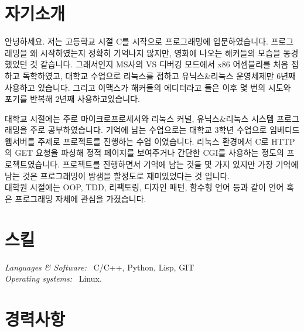 \documentclass[line,margin]{res}
\begin{document}
\address{H.P: 010-8633-9775}
\address{E-mail: vmfhrmfoaj@yahoo.com}


\begin{resume}

  \section{자기소개}

  안녕하세요.
  저는 고등학교 시절 C를 시작으로 프로그래밍에 입문하였습니다.
  프로그래밍을 왜 시작하였는지 정확히 기억나지 않지만, 영화에 나오는 해커들의 모습을 동경했었던 것 같습니다.
  그래서인지 MS사의 VS 디버깅 모드에서 x86 어셈블리를 처음 접하고 독학하였고,
  대학교 수업으로 리눅스를 접하고 유닉스\&리눅스 운영체제만 6년째 사용하고 있습니다.
  그리고 이맥스가 해커들의 에디터라고 들은 이후 몇 번의 시도와 포기를 반복해 2년째 사용하고있습니다.

  대학교 시절에는 주로 마이크로프로세서와 리눅스 커널, 유닉스\&리눅스 시스템 프로그래밍을 주로 공부하였습니다.
  기억에 남는 수업으로는 대학교 3학년 수업으로 임베디드 웹서버를 주제로 프로젝트를 진행하는 수업 이였습니다.
  리눅스 환경에서 C로 HTTP의 GET 요청을 파싱해 정적 페이지를 보여주거나 간단한 CGI를 사용하는 정도의 프로젝트였습니다.
  프로젝트를 진행하면서 기억에 남는 것들 몇 가지 있지만 가장 기억에 남는 것은 프로그래밍이 밤샘을 할정도로 재미있었다는 것 입니다. \\
  대학원 시절에는 OOP, TDD, 리팩토링, 디자인 패턴, 함수형 언어 등과 같이 언어 혹은 프로그래밍 자체에 관심을 가졌습니다.


  \section{스킬}

  {\sl Languages \& Software:} ~C/C++, Python, Lisp, GIT \\
  {\sl Operating systems:} ~Linux.


  \section{경력사항}


\end{resume}
\end{document}
